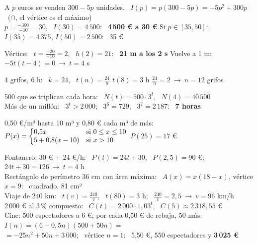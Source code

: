 \documentclass[11pt,a4paper]{article}
\makeatletter
\newcommand{\cas}[1]{\left\{\begin{array}{@{}l@{\quad}l@{}}#1\end{array}\right.}
\makeatother
\begin{document}
\vfill
\begin{exemple}
A $p$ euros se venden $300-5p$ unidades. \ $I(p)=p(300-5p)=-5p^2+300p$ \ ($\cap$, el vértice es el máximo)\\[3pt]
$p=\frac{-300}{-10}=30$, \ $I(30)=4\,500$: \ \textbf{4\,500 € a 30 €} \qquad Si $p\in[35,50]$: \ $I(35)=4\,375$, $I(50)=2\,500$: \ 35 €
\end{exemple}

\vfill
\begin{exemple}[Cuadrática: \ altura de una pelota \ $h(t)=-5t^2+20t+1$]
Vértice: \ $t=\frac{-20}{-10}=2$, \ $h(2)=21$: \ \textbf{21 m a los 2 s} \qquad Vuelve a 1 m: \ $-5t(t-4)=0\ \to\ t=4$ s
\end{exemple}

\newpage
\begin{exemple}
4 grifos, 6 h: \ $k=24$, \ $t(n)=\frac{24}{n}$ \qquad $t(8)=3$ h \qquad $\frac{24}{n}=2\ \to\ n=12$ grifos
\end{exemple}

\vfill
\begin{exemple}
500 que se triplican cada hora: \ $N(t)=500\cdot3^t$, \ $N(4)=40\,500$\\[3pt]
Más de un millón: \ $3^t>2\,000$; \ $3^6=729$, \ $3^7=2\,187$: \ \textbf{7 horas}
\end{exemple}

\vfill
\begin{exemple}
0,50 €/m³ hasta 10 m³ y 0,80 € cada m³ de más: \ $P(x)=\cas{0{,}5x & \text{si } 0\le x\le10\\ 5+0{,}8(x-10) & \text{si } x>10}$ \quad $P(25)=17$ €
\end{exemple}

\vfill
\begin{exemple}
Fontanero: 30 € + 24 €/h: \ $P(t)=24t+30$, \ $P(2{,}5)=90$ €; \ $24t+30=126\ \to\ t=4$ h\\[4pt]
Rectángulo de perímetro 36 cm con área máxima: \ $A(x)=x(18-x)$, vértice $x=9$: \ cuadrado, 81 cm²\\[4pt]
Viaje de 240 km: \ $t(v)=\frac{240}{v}$, \ $t(80)=3$ h; \ $\frac{240}{v}=2{,}5\ \to\ v=96$ km/h\\[4pt]
2\,000 € al 3\,\% compuesto: \ $C(t)=2\,000\cdot1{,}03^t$, \ $C(5)\approx2\,318{,}55$ €\\[4pt]
Cine: 500 espectadores a 6 €; por cada 0,50 € de rebaja, 50 más: \ $I(n)=(6-0{,}5n)(500+50n)=$\\ \hspace*{1em}$=-25n^2+50n+3\,000$; \ vértice $n=1$: \ 5,50 €, 550 espectadores y \textbf{3\,025 €}
\end{exemple}
\end{document}
